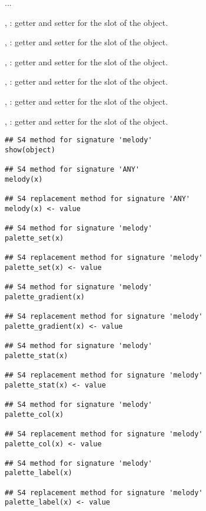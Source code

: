 \documentclass[letterpaper]{book}
\begin{document}
%
\begin{Description}\relax
...

, : getter and setter
for the  slot of the object.

, : getter and setter
for the  slot of the object.

, : getter and setter
for the  slot of the object.

, : getter and setter
for the  slot of the object.

, : getter and setter
for the  slot of the object.

, : getter and setter
for the  slot of the object.
\end{Description}
%
\begin{Usage}
\begin{verbatim}
## S4 method for signature 'melody'
show(object)

## S4 method for signature 'ANY'
melody(x)

## S4 replacement method for signature 'ANY'
melody(x) <- value

## S4 method for signature 'melody'
palette_set(x)

## S4 replacement method for signature 'melody'
palette_set(x) <- value

## S4 method for signature 'melody'
palette_gradient(x)

## S4 replacement method for signature 'melody'
palette_gradient(x) <- value

## S4 method for signature 'melody'
palette_stat(x)

## S4 replacement method for signature 'melody'
palette_stat(x) <- value

## S4 method for signature 'melody'
palette_col(x)

## S4 replacement method for signature 'melody'
palette_col(x) <- value

## S4 method for signature 'melody'
palette_label(x)

## S4 replacement method for signature 'melody'
palette_label(x) <- value
\end{verbatim}
\end{Usage}
\end{document}
